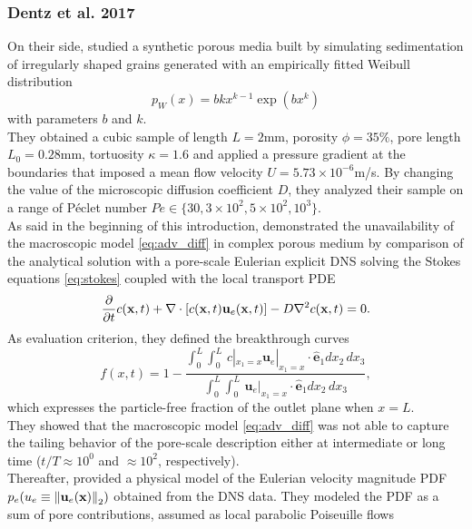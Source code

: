 \subsubsection{Dentz et al. 2017}
On their side, \citet{Dentz2017} studied a synthetic porous media built by simulating sedimentation of irregularly shaped grains generated with an empirically fitted Weibull distribution
\begin{equation}\label{eq:weibull}
	p_W(x)=bkx^{k-1}\exp(bx^k)
\end{equation}
with parameters $b$ and $k$.\\
They obtained a cubic sample of length $L=2$mm, porosity $\phi=35\%$, pore length $L_0=0.28$mm, tortuosity $\kappa=1.6$ and applied a pressure gradient at the boundaries that imposed a mean flow velocity $U=5.73\times 10^{-6}$m/s. By changing the value of the microscopic diffusion coefficient $D$, they analyzed their sample on a range of Péclet number $Pe\in\{30, 3\times 10^2, 5\times 10^2, 10^3\}$.\\
As said in the beginning of this introduction, \citeauthor{Dentz2017} demonstrated the unavailability of the macroscopic model \eqref{eq:adv_diff} in complex porous medium by comparison of the analytical solution with a pore-scale Eulerian explicit DNS solving the Stokes equations \eqref{eq:stokes} coupled with the local transport PDE
\begin{equation}\label{eq:micro_adv_diff}
\pdv{t}c(\textbf{x},t)+\nabla\cdot[c(\textbf{x},t)\textbf{u}_e(\textbf{x},t)]-D \nabla^2c(\textbf{x},t)=0.
\end{equation}
As evaluation criterion, they defined the breakthrough curves
\begin{equation}
f(x,t)=1-\frac{\int_0^L\int_0^L\,c|_{x_1=x}\textbf{u}_e|_{x_1=x}\cdot \hat{\textbf{e}}_1 dx_2\,dx_3}{\int_0^L\int_0^L\,\textbf{u}_e|_{x_1=x}\cdot \hat{\textbf{e}}_1dx_2\,dx_3},
\label{eq:DentzBTC}
\end{equation}
which expresses the particle-free fraction of the outlet plane when $x=L$.\\
They showed that the macroscopic model \eqref{eq:adv_diff} was not able to capture the tailing behavior of the pore-scale description either at intermediate or long time ($t/T\approx 10^0$ and $\approx 10^2$, respectively).\\
Thereafter, \citeauthor{Dentz2017} provided a physical model of the Eulerian velocity magnitude PDF $p_e(u_e\equiv\norm{\textbf{u}_e(\textbf{x})}_2)$  obtained from the DNS data. 
They modeled the PDF as a sum of pore contributions, assumed as local parabolic Poiseuille flows 
